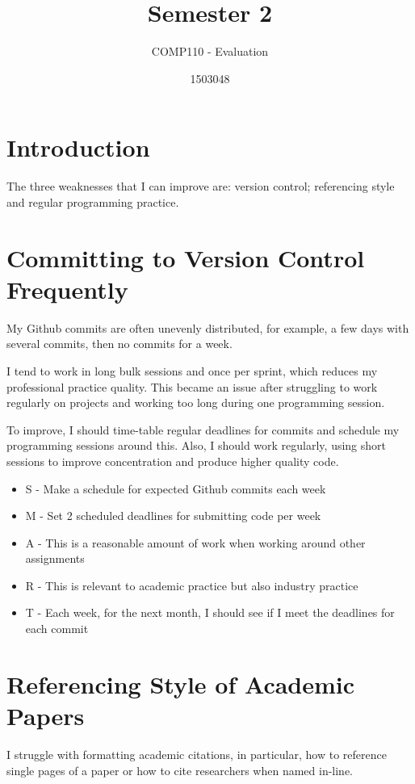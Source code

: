 \documentclass{scrartcl}
\title{Semester 2}
\subtitle{COMP110 - Evaluation}
\author{1503048}
\begin{document}
\maketitle

\section*{Introduction}
The three weaknesses that I can improve are: version control; referencing style and regular programming practice.

\section*{Committing to Version Control Frequently}
My Github commits are often unevenly distributed, for example, a few days with several commits, then no commits for a week.

I tend to work in long bulk sessions and once per sprint, which reduces my professional practice quality. This became an issue after struggling to work regularly on projects and working too long during one programming session.

To improve, I should time-table regular deadlines for commits and schedule my programming sessions around this. Also, I should work regularly, using short sessions to improve concentration and produce higher quality code.

 \begin{itemize}
   \item  S - Make a schedule for expected Github commits each week
	\item M - Set 2 scheduled deadlines for submitting code per week
	\item A - This is a reasonable amount of work when working around other assignments
	\item R - This is relevant to academic practice but also industry practice
	\item T - Each week, for the next month, I should see if I meet the deadlines for each commit
 \end{itemize}

\section*{Referencing Style of Academic Papers}
I struggle with formatting academic citations, in particular, how to reference single pages of a paper or how to cite researchers when named in-line.
\end{document}
